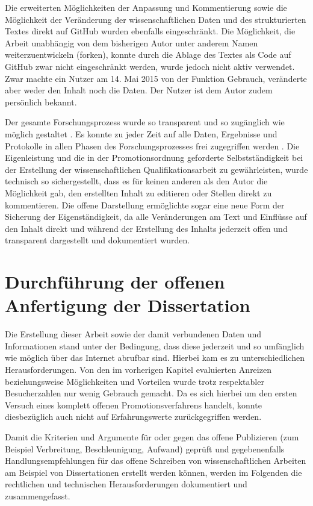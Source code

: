 Die erweiterten Möglichkeiten der Anpassung und Kommentierung sowie die Möglichkeit der Veränderung der wissenschaftlichen Daten und des strukturierten Textes direkt auf GitHub wurden ebenfalls eingeschränkt. Die Möglichkeit, die Arbeit unabhängig von dem bisherigen Autor unter anderem Namen weiterzuentwickeln (forken), konnte durch die Ablage des Textes als Code auf GitHub zwar nicht eingeschränkt werden, wurde jedoch nicht aktiv verwendet. Zwar machte ein Nutzer am 14. Mai 2015 von der Funktion Gebrauch, veränderte aber weder den Inhalt noch die Daten. Der Nutzer ist dem Autor zudem persönlich bekannt.

Der gesamte Forschungsprozess wurde so transparent und so zugänglich wie möglich gestaltet \cite{Scheliga_2014}. Es konnte zu jeder Zeit auf alle Daten, Ergebnisse und Protokolle in allen Phasen des Forschungsprozesses frei zugegriffen werden \cite{RIN_2010}. Die Eigenleistung und die in der Promotionsordnung geforderte \cite{Leuphana_2011} Selbstständigkeit bei der Erstellung der wissenschaftlichen Qualifikationsarbeit zu gewährleisten, wurde technisch so sichergestellt, dass es für keinen anderen als den Autor die Möglichkeit gab, den erstellten Inhalt zu editieren oder Stellen direkt zu kommentieren. Die offene Darstellung ermöglichte sogar eine neue Form der Sicherung der Eigenständigkeit, da alle Veränderungen am Text und Einflüsse auf den Inhalt direkt und während der Erstellung des Inhalts jederzeit offen und transparent dargestellt und dokumentiert wurden.

\section{Durchführung der offenen Anfertigung der Dissertation}

Die Erstellung dieser Arbeit sowie der damit verbundenen Daten und Informationen stand unter der Bedingung, dass diese jederzeit und so umfänglich wie möglich über das Internet abrufbar sind. Hierbei kam es zu unterschiedlichen Herausforderungen. Von den im vorherigen Kapitel evaluierten Anreizen beziehungsweise Möglichkeiten und Vorteilen wurde trotz respektabler Besucherzahlen nur wenig Gebrauch gemacht. Da es sich hierbei um den ersten Versuch eines komplett offenen Promotionsverfahrens handelt, konnte diesbezüglich auch nicht auf Erfahrungswerte zurückgegriffen werden.

Damit die Kriterien und Argumente für oder gegen das offene Publizieren (zum Beispiel Verbreitung, Beschleunigung, Aufwand) geprüft und gegebenenfalls Handlungsempfehlungen für das offene Schreiben von wissenschaftlichen Arbeiten am Beispiel von Dissertationen erstellt werden können, werden im Folgenden die rechtlichen und technischen Herausforderungen dokumentiert und zusammengefasst.

